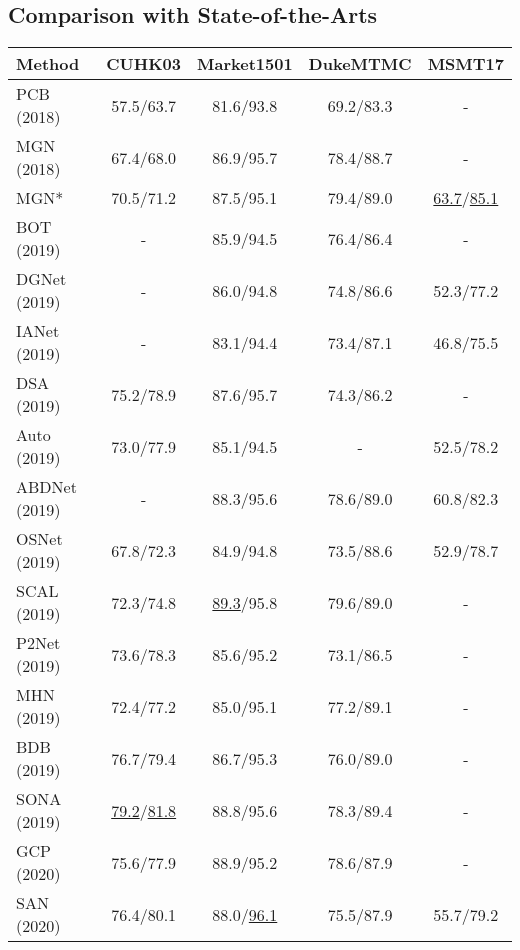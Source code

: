\documentclass[final]{cvpr}
\begin{document}
\subsection{Comparison with State-of-the-Arts}
\begin{table}
\footnotesize
\setlength{\tabcolsep}{1.1mm}
    \centering
    \begin{tabular}{l|cccc}
    \shline
    Method & CUHK03 & Market1501 & DukeMTMC & MSMT17 \\ 
    \hline
    PCB~\cite{sun2018PCB} (2018) & 57.5/63.7 & 81.6/93.8 & 69.2/83.3 & - \\
    MGN~\cite{wang2018learning} (2018) & 67.4/68.0 & 86.9/95.7 & 78.4/88.7 & - \\
    MGN* & 70.5/71.2 & 87.5/95.1 & 79.4/89.0 & \underline{63.7}/\underline{85.1} \\
    BOT~\cite{luo2019strong} (2019) & - & 85.9/94.5 & 76.4/86.4 & - \\
    DGNet~\cite{zheng2019joint} (2019) & - & 86.0/94.8 & 74.8/86.6 & 52.3/77.2 \\
    IANet~\cite{hou2019interaction} (2019) & - & 83.1/94.4 & 73.4/87.1 & 46.8/75.5 \\
    DSA~\cite{zhang2019densely} (2019) & 75.2/78.9 & 87.6/95.7 & 74.3/86.2 & - \\
    Auto~\cite{quan2019auto} (2019) & 73.0/77.9 & 85.1/94.5 & - & 52.5/78.2 \\
    ABDNet~\cite{chen2019abd} (2019) & - & 88.3/95.6 & 78.6/89.0 & 60.8/82.3 \\
    OSNet~\cite{zhou2019omni} (2019) & 67.8/72.3 & 84.9/94.8 & 73.5/88.6 & 52.9/78.7 \\
    SCAL~\cite{chen2019self} (2019) & 72.3/74.8 & \underline{89.3}/95.8 & 79.6/89.0 & - \\
    P2Net~\cite{guo2019beyond} (2019) & 73.6/78.3 & 85.6/95.2 & 73.1/86.5 & - \\
    MHN~\cite{chen2019mixed} (2019) & 72.4/77.2 & 85.0/95.1 & 77.2/89.1 & - \\
    BDB~\cite{dai2019batch} (2019) & 76.7/79.4 & 86.7/95.3 & 76.0/89.0 & - \\
    SONA~\cite{xia2019second} (2019) & \underline{79.2}/\underline{81.8} & 88.8/95.6 & 78.3/89.4 & - \\
    GCP~\cite{park2020relation} (2020) & 75.6/77.9 & 88.9/95.2 & 78.6/87.9 & - \\
    SAN~\cite{jin2020semantics} (2020) & 76.4/80.1 & 88.0/\underline{96.1} & 75.5/87.9 & 55.7/79.2 \\

\end{tabular}
\end{table}
\end{document}
